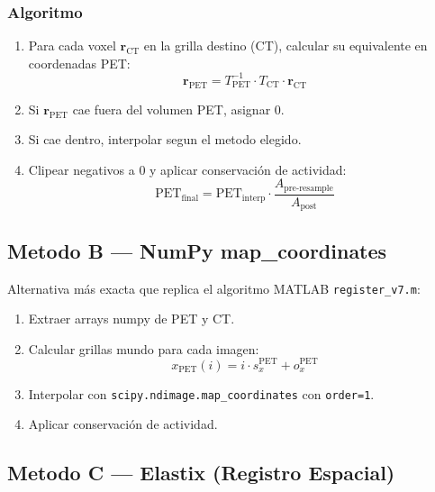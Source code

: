 \documentclass[12pt,a4paper]{article}
\begin{document}
\subsubsection{Algoritmo}

\begin{enumerate}
    \item Para cada voxel $\mathbf{r}_{\text{CT}}$ en la grilla destino (CT), calcular su
          equivalente en coordenadas PET:
          \begin{equation}\label{eq:coord_pet}
              \mathbf{r}_{\text{PET}} = T_{\text{PET}}^{-1} \cdot T_{\text{CT}} \cdot \mathbf{r}_{\text{CT}}
          \end{equation}
    \item Si $\mathbf{r}_{\text{PET}}$ cae fuera del volumen PET, asignar 0.
    \item Si cae dentro, interpolar segun el metodo elegido.
    \item Clipear negativos a 0 y aplicar conservación de actividad:
          \begin{equation}\label{eq:act_post}
              \text{PET}_{\text{final}} = \text{PET}_{\text{interp}} \cdot \frac{A_{\text{pre-resample}}}{A_{\text{post}}}
          \end{equation}
\end{enumerate}

\subsection{Metodo B --- NumPy map\_coordinates}

Alternativa más exacta que replica el algoritmo MATLAB \texttt{register\_v7.m}:

\begin{enumerate}
    \item Extraer arrays numpy de PET y CT.
    \item Calcular grillas mundo para cada imagen:
          \begin{equation}\label{eq:grilla_mundo}
              x_{\text{PET}}(i) = i \cdot s_x^{\text{PET}} + o_x^{\text{PET}}
          \end{equation}
    \item Interpolar con \texttt{scipy.ndimage.map\_coordinates} con \texttt{order=1}.
    \item Aplicar conservación de actividad.
\end{enumerate}

\subsection{Metodo C --- Elastix (Registro Espacial)}
\end{document}
